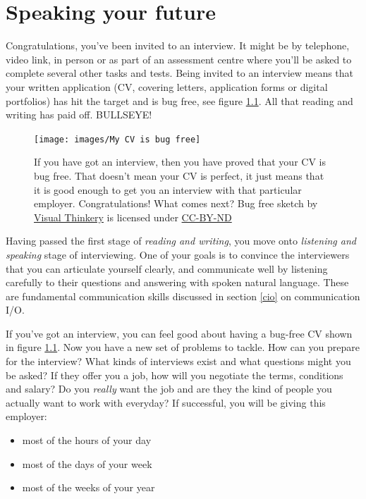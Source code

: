 \documentclass[
]{book}
\providecommand{\tightlist}{%
  \setlength{\itemsep}{0pt}\setlength{\parskip}{0pt}}
\begin{document}
\hypertarget{speaking}{%
\chapter{Speaking your future}\label{speaking}}

Congratulations, you've been invited to an interview. It might be by telephone, video link, in person or as part of an assessment centre where you'll be asked to complete several other tasks and tests. Being invited to an interview means that your written application (CV, covering letters, application forms or digital portfolios) has hit the target and is bug free, see figure \ref{fig:bugfree-fig}. All that reading and writing has paid off. BULLSEYE! 🎯

\begin{figure}

{\centering \texttt{[image: images/My CV is bug free]} 

}

\caption{If you have got an interview, then you have proved that your CV is bug free. That doesn't mean your CV is perfect, it just means that it is good enough to get you an interview with that particular employer. Congratulations! What comes next? Bug free sketch by \href{https://visualthinkery.com/}{Visual Thinkery} is licensed under \href{https://creativecommons.org/licenses/by-nd/4.0/}{CC-BY-ND}}\label{fig:bugfree-fig}
\end{figure}



Having passed the first stage of \emph{reading and writing}, you move onto \emph{listening and speaking} stage of interviewing. One of your goals is to convince the interviewers that you can articulate yourself clearly, and communicate well by listening carefully to their questions and answering with spoken natural language. These are fundamental communication skills discussed in section \ref{cio} on communication I/O.

If you've got an interview, you can feel good about having a bug-free CV shown in figure \ref{fig:bugfree-fig}. Now you have a new set of problems to tackle. How can you prepare for the interview? What kinds of interviews exist and what questions might you be asked? If they offer you a job, how will you negotiate the terms, conditions and salary? Do you \emph{really} want the job and are they the kind of people you actually want to work with everyday? If successful, you will be giving this employer:

\begin{itemize}
\tightlist
\item
  most of the hours of your day
\item
  most of the days of your week
\item
  most of the weeks of your year
\end{itemize}
\end{document}

